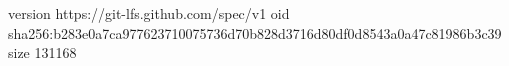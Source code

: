 version https://git-lfs.github.com/spec/v1
oid sha256:b283e0a7ca977623710075736d70b828d3716d80df0d8543a0a47c81986b3c39
size 131168
